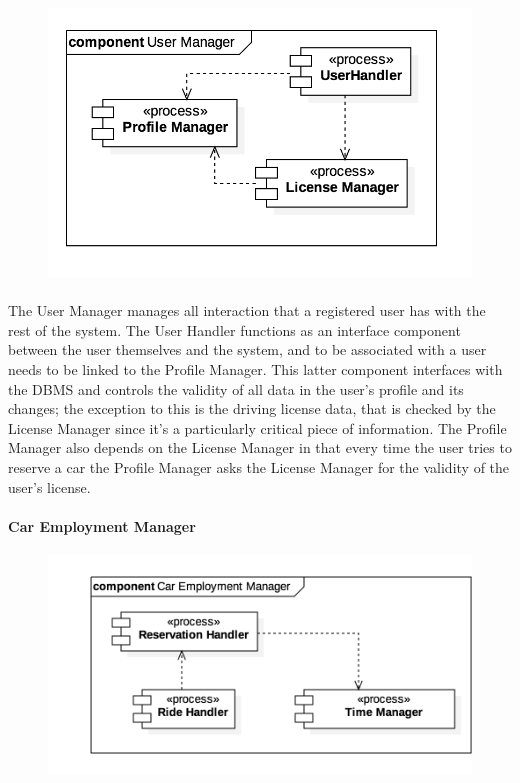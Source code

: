 			\begin{figure}[h]
				\includegraphics[scale=0.4, center]{img/component_diagrams/03_user_manager.png}
			\end{figure}
			
		\paragraph{} The User Manager manages all interaction that a registered user has with the rest of the system. The User Handler functions as an interface component between the user themselves and the system, and to be associated with a user needs to be linked to the Profile Manager. This latter component interfaces with the DBMS and controls the validity of all data in the user's profile and its changes; the exception to this is the driving license data, that is checked by the License Manager since it's a particularly critical piece of information. The Profile Manager also depends on the License Manager in that every time the user tries to reserve a car the Profile Manager asks the License Manager for the validity of the user's license. 
		
		
		\paragraph{Car Employment Manager}
		
			\begin{figure}[h]
				\includegraphics[scale=0.4, center]{img/component_diagrams/04_car_employment_manager.png} %
			\end{figure}
			
